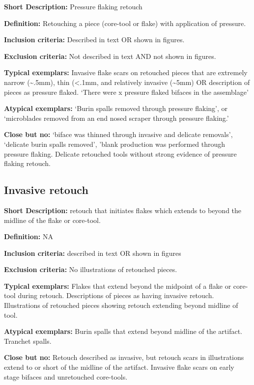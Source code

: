 \documentclass[
]{article}
\begin{document}
\textbf{Short Description:} Pressure flaking retouch

\textbf{Definition:} Retouching a piece (core-tool or flake) with
application of pressure.

\textbf{Inclusion criteria:} Described in text OR shown in figures.

\textbf{Exclusion criteria:} Not described in text AND not shown in
figures.

\textbf{Typical exemplars:} Invasive flake scars on retouched pieces
that are extremely narrow (\textasciitilde.5mm), thin (\textless.1mm,
and relatively invasive (\textasciitilde5mm) OR description of pieces as
pressure flaked. `There were x pressure flaked bifaces in the
assemblage'

\textbf{Atypical exemplars:} `Burin spalls removed through pressure
flaking', or `microblades removed from an end nosed scraper through
pressure flaking.'

\textbf{Close but no:} `biface was thinned through invasive and delicate
removals', `delicate burin spalls removed', 'blank production was
performed through pressure flaking. Delicate retouched tools without
strong evidence of pressure flaking retouch.

\hypertarget{invasive-retouch}{%
\subsection{Invasive retouch}\label{invasive-retouch}}

\textbf{Short Description:} retouch that initiates flakes which extends
to beyond the midline of the flake or core-tool.

\textbf{Definition:} NA

\textbf{Inclusion criteria:} described in text OR shown in figures

\textbf{Exclusion criteria:} No illustrations of retouched pieces.

\textbf{Typical exemplars:} Flakes that extend beyond the midpoint of a
flake or core-tool during retouch. Descriptions of pieces as having
invasive retouch. Illustrations of retouched pieces showing retouch
extending beyond midline of tool.

\textbf{Atypical exemplars:} Burin spalls that extend beyond midline of
the artifact. Tranchet spalls.

\textbf{Close but no:} Retouch described as invasive, but retouch scars
in illustrations extend to or short of the midline of the artifact.
Invasive flake scars on early stage bifaces and unretouched core-tools.
\end{document}
